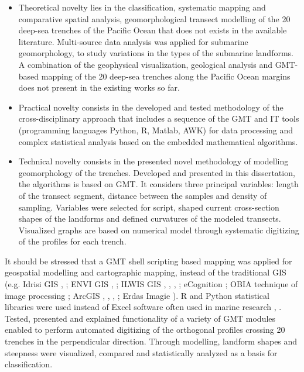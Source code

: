 \documentclass[11pt,a4paper]{report}
\begin{document}
{\begin{itemize}
	\item Theoretical novelty lies in the classification, systematic mapping and comparative spatial analysis, geomorphological transect modelling of the 20 deep-sea trenches of the Pacific Ocean that does not exists in the available literature. Multi-source data analysis was applied for submarine geomorphology, to study variations in the types of the submarine landforms. A combination of the geophysical visualization, geological analysis and \ac{GMT}-based mapping of the 20 deep-sea trenches along the Pacific Ocean margins does not present in the existing works so far. 
	\item Practical novelty consists in the developed and tested methodology of the cross-disciplinary approach that includes a sequence of the \ac{GMT} and IT tools (programming languages Python, R, Matlab, AWK) for data processing and complex statistical analysis based on the embedded mathematical algorithms. 
	\item Technical novelty consists in the presented novel methodology of modelling geomorphology of the trenches. Developed and presented in this dissertation, the algorithms is based on \ac{GMT}. It considers three principal variables: length of the transect segment, distance between the samples and density of sampling. Variables were selected for script, shaped current cross-section shapes of the landforms and defined curvatures of the modeled transects. Visualized graphs are based on numerical model through systematic digitizing of the profiles for each trench.   
\end{itemize}

It should be stressed that a \ac{GMT} shell scripting based mapping was applied for geospatial modelling and cartographic mapping, instead of the traditional \ac{GIS} (e.g. Idrisi GIS \cite{Lemenkova2016h}, \cite{Lemenkova2014i}; ENVI GIS \cite{Lemenkova2016a}, \cite{Lemenkova2014c}; ILWIS GIS \cite{Lemenkova201507}, \cite{Lemenkova2014n}, \cite{Lemenkova2013b}, \cite{Lemenkova2012l}; eCognition \cite{Lemenkova2014l}; OBIA technique of image processing \cite{Lemenkova201528}; ArcGIS \cite{Lemenkova2016i}, \cite{Lemenkova2013h}, \cite{Lemenkova2016l}, \cite{Lemenkova2016e}; Erdas Imagie \cite{Lemenkova2013j}). R and Python statistical libraries were used instead of Excel software often used in marine research \cite{Lemenkova2016o}, \cite{Lemenkova202030}. Tested, presented and explained functionality of a variety of \ac{GMT} modules enabled to perform automated digitizing of the orthogonal profiles crossing 20 trenches in the perpendicular direction. Through modelling, landform shapes and steepness were visualized, compared and statistically analyzed as a basis for classification. 

}
\end{document}
